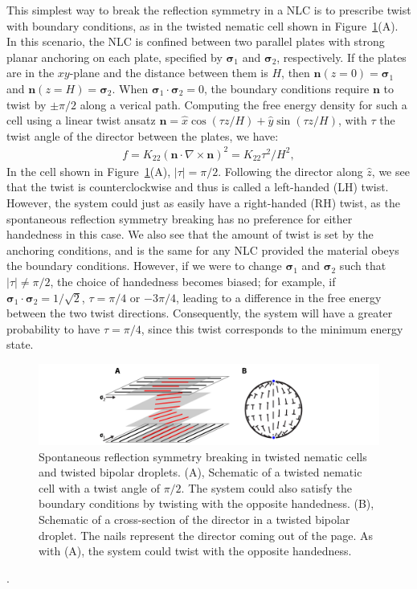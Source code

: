 This simplest way to break the reflection symmetry in a NLC is to prescribe twist with boundary conditions, as in the twisted nematic cell shown in Figure~\ref{f:4-SSB}(A).
In this scenario, the NLC is confined between two parallel plates with strong planar anchoring on each plate, specified by $\bm{\sigma}_1$ and $\bm{\sigma}_2$, respectively.
If the plates are in the $xy$-plane and the distance between them is $H$, then $\mathbf{n}(z = 0) = \bm{\sigma}_1$ and $\mathbf{n}(z = H) = \bm{\sigma}_2$.
When $\bm{\sigma}_1 \cdot \bm{\sigma}_2 = 0$, the boundary conditions require $\mathbf{n}$ to twist by $\pm \pi/2$ along a verical path.
Computing the free energy density for such a cell using a linear twist ansatz $\mathbf{n} = \hat{x} \cos (\tau z/H) + \hat{y} \sin(\tau z/H)$, with $\tau$ the twist angle of the director between the plates, we have:
\begin{align}
  f = K_{22}(\mathbf{n} \cdot \nabla \times \mathbf{n})^2 = K_{22}\tau^2/H^2,
\end{align}
In the cell shown in Figure~\ref{f:4-SSB}(A), $|\tau| = \pi/2$.
Following the director along $\hat{z}$, we see that the twist is counterclockwise and thus is called a left-handed (LH) twist.
However, the system could just as easily have a right-handed (RH) twist, as the spontaneous reflection symmetry breaking has no preference for either handedness in this case.
We also see that the amount of twist is set by the anchoring conditions, and is the same for any NLC provided the material obeys the boundary conditions.
However, if we were to change $\bm{\sigma}_1$ and $\bm{\sigma}_2$ such that $|\tau| \neq \pi/2$, the choice of handedness becomes biased; for example, if $\bm{\sigma}_1 \cdot \bm{\sigma}_2 = 1/\sqrt{2}$, $\tau = \pi/4$ or $-3\pi/4$, leading to a difference in the free energy between the two twist directions.
Consequently, the system will have a greater probability to have $\tau = \pi/4$, since this twist corresponds to the minimum energy state.
\begin{figure}
  \centering
  \includegraphics{figures/C4/Ch4-Figs_SSB.png}
  \caption{Spontaneous reflection symmetry breaking in twisted nematic cells and twisted bipolar droplets.
  (A), Schematic of a twisted nematic cell with a twist angle of $\pi/2$.
  The system could also satisfy the boundary conditions by twisting with the opposite handedness.
  (B), Schematic of a cross-section of the director in a twisted bipolar droplet.
  The nails represent the director coming out of the page.
  As with (A), the system could twist with the opposite handedness.}\label{f:4-SSB}
\end{figure}.

